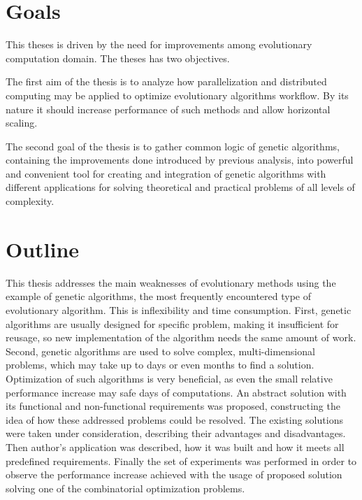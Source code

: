 \chapter*{Goals}

This theses is driven by the need for improvements among evolutionary computation domain. The theses has two objectives.

The first aim of the thesis is to analyze how parallelization and distributed computing may be applied to optimize evolutionary algorithms workflow. By its nature it should increase performance of such methods and allow horizontal scaling.

The second goal of the thesis is to gather common logic of genetic algorithms, containing the improvements done introduced by previous analysis, into powerful and convenient tool for creating and integration of genetic algorithms with different applications for solving theoretical and practical problems of all levels of complexity.

\chapter*{Outline}

This thesis addresses the main weaknesses of evolutionary methods using the example of genetic algorithms, the most frequently encountered type of evolutionary algorithm. This is inflexibility and time consumption. First, genetic algorithms are usually designed for specific problem, making it insufficient for reusage, so new implementation of the algorithm needs the same amount of work. Second, genetic algorithms are used to solve complex, multi-dimensional problems, which may take up to days or even months to find a solution. Optimization of such algorithms is very beneficial, as even the small relative performance increase may safe days of computations. An abstract solution with its functional and non-functional requirements was proposed, constructing the idea of how these addressed problems could be resolved. The existing solutions were taken under consideration, describing their advantages and disadvantages. Then author's application was described, how it was built and how it meets all predefined requirements. Finally the set of experiments was performed in order to observe the performance increase achieved with the usage of proposed solution solving one of the combinatorial optimization problems.